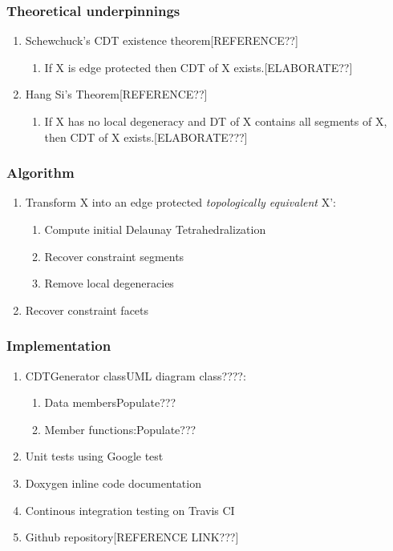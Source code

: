 \documentclass{beamer}
\begin{document}
	\begin{frame}
		\frametitle{Theoretical underpinnings}
			\begin{enumerate}
				\item	Schewchuck's CDT existence theorem[REFERENCE??]
					\begin{enumerate}
						\item If X is edge protected then CDT of X exists.[ELABORATE??]	
					\end{enumerate}		
				\item	Hang Si's Theorem[REFERENCE??]
					\begin{enumerate}
						\item If X has no local degeneracy and DT of X contains all segments of X, then CDT of X exists.[ELABORATE???] 
					\end{enumerate}		
			\end{enumerate}		
	\end{frame}	
	\begin{frame}
		\frametitle{Algorithm} 
			\begin{enumerate}
				\item Transform X into an edge protected \textit{topologically equivalent} X':	
				\begin{enumerate}
					\item Compute initial Delaunay Tetrahedralization	
					\item Recover constraint segments
					\item Remove local degeneracies
				\end{enumerate}
				\item Recover constraint facets
			\end{enumerate}		
	\end{frame}
	\begin{frame}
		\frametitle{Implementation}
			\begin{enumerate}
				\item CDTGenerator class{UML diagram class????}:
					\begin{enumerate}
						\item Data members{Populate???}
						\item Member functions:{Populate???}	
					\end{enumerate}		
				\item Unit tests using Google test
				\item Doxygen inline code documentation
				\item Continous integration testing on Travis CI	
				\item Github repository[REFERENCE LINK???]	
			\end{enumerate}
	\end{frame}	
\end{document}
